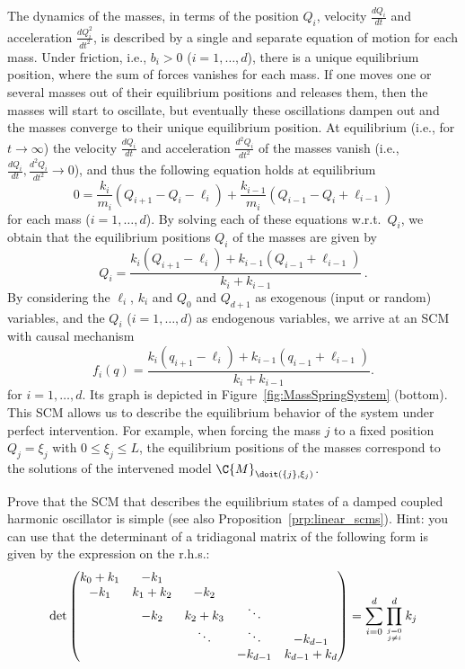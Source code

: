 \begin{Eg}
The dynamics of the masses, in terms of the position $Q_i$, velocity $\frac{dQ_i}{dt}$ and acceleration $\frac{dQ_i^2}{dt^2}$, is described by a single and separate equation of motion for each mass. Under friction, i.e., $b_i>0$ ($i=1,\dots,d$), there is a unique equilibrium position, where the sum of forces vanishes for each mass. If one moves one or several masses out of their equilibrium positions and releases them, then the masses will start to oscillate, but eventually these oscillations dampen out and the masses converge to their unique equilibrium position. At equilibrium (i.e., for $t\to\infty$) the velocity $\frac{dQ_i}{dt}$ and acceleration $\frac{d^2Q_i}{dt^2}$ of the masses vanish (i.e., $\frac{dQ_i}{dt},\frac{d^2Q_i}{dt^2}\to 0$), and thus the following equation holds at equilibrium
$$
  0 = \frac{k_i}{m_i} (Q_{i+1} - Q_i - \ell_i) + \frac{k_{i-1}}{m_i} (Q_{i-1} - Q_i + \ell_{i-1})
$$
for each mass ($i=1,\dots,d$). By solving each of these equations w.r.t.\ $Q_i$, we obtain that the equilibrium positions $Q_i$ of the masses are given by
$$
  Q_i = \frac{k_i(Q_{i+1} - \ell_i) + k_{i-1}(Q_{i-1}+\ell_{i-1})}{k_i + k_{i-1}}\,.
$$
By considering the $\ell_i$, $k_i$ and $Q_0$ and $Q_{d+1}$ as exogenous (input or random) variables, and the
$Q_i$ ($i=1,\dots,d$) as endogenous variables, we arrive at an SCM with causal mechanism
$$
f_i(q) = \frac{k_i(q_{i+1} - \ell_i) + k_{i-1}(q_{i-1}+\ell_{i-1})}{k_i + k_{i-1}}.
$$
for $i=1,\dots,d$.
Its graph is depicted in Figure~\ref{fig:MassSpringSystem} (bottom). This SCM allows us to describe the equilibrium behavior of the system under perfect intervention. For example, when forcing the mass $j$ to a fixed position $Q_j=\xi_j$ with $0\leq \xi_j\leq L$, the equilibrium positions of the masses correspond to the solutions of the intervened model $\C{M}_{\doit(\{j\},\xi_j)}$. 
\end{Eg}
\begin{Exc}
Prove that the SCM that describes the equilibrium states of a damped coupled harmonic oscillator is simple
(see also Proposition~\ref{prp:linear_scms}). Hint: you can use that the determinant of a tridiagonal matrix of the following
form is given by the expression on the r.h.s.:
  $$\det \begin{pmatrix}
    k_0+k_1 & -k_1       &           &         & \\
    -k_1     & k_1 + k_2 & -k_2       &         & \\
            & -k_2       & k_2 + k_3 & \ddots  & \\
            &           & \ddots    & \ddots  & -k_{d-1} \\
            &           &           & -k_{d-1} & k_{d-1} + k_d \\
  \end{pmatrix} = \sum_{i=0}^d \prod_{j=0 \atop j\ne i}^d k_j
  $$
\end{Exc}

